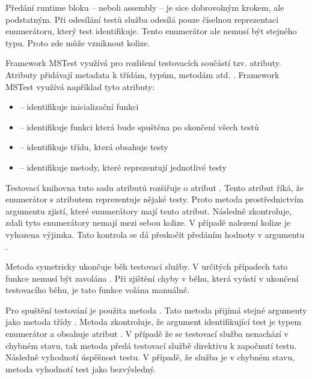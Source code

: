 Předání runtime bloku -- neboli assembly -- je sice dobrovolným krokem, ale podstatným. Při odesílání testů služba odesílá pouze číselnou reprezentaci enumerátoru, který test identifikuje. Tento enumerátor ale nemusí být stejného typu. Proto zde může vzniknout kolize.

Framework MSTest využívá pro rozlišení testovacích součástí tzv. atributy. Atributy přidávají metadata k třídám, typům, metodám atd. \cite{attribute_docs}. Framework MSTest využívá například tyto atributy:

\begin{itemize}
    \item {} -- identifikuje inicializační funkci
    \item {} -- identifikuje funkci která bude spuštěna po skončení všech testů
    \item {} -- identifikuje třídu, která obsahuje testy
    \item {} -- identifikuje metody, které reprezentují jednotlivé testy
\end{itemize}

Testovací knihovna tuto sadu atributů rozšiřuje o atribut . Tento atribut říká, že enumerátor s atributem  reprezentuje nějaké testy. Proto metoda  prostřednictvím argumentu  zjistí, které enumerátory mají tento atribut. Následně zkontroluje, zdali tyto enumerátory nemají mezi sebou kolize. V případě nalezení kolize je vyhozena výjimka. Tato kontrola se dá přeskočit předáním hodnoty  v argumentu .

Metoda  symetricky ukončuje běh testovací služby. V určitých případech tato funkce nemusí být zavolána . Při zjištění chyby v běhu, která vyústí v ukončení testovacího běhu, je tato funkce volána manuálně.

Pro spuštění testování je použita metoda . Tato metoda přijímá stejné argumenty jako metoda  třídy . Metoda zkontroluje, že argument identifikující test je typem enumerátor a obsahuje atribut . V případě že se testovací služba nenachází v chybném stavu, tak metoda předá testovací službě direktivu k započnutí testu. Následně vyhodnotí úspěšnost testu. V případě, že služba je v chybném stavu, metoda vyhodnotí test jako bezvýsledný. 
 